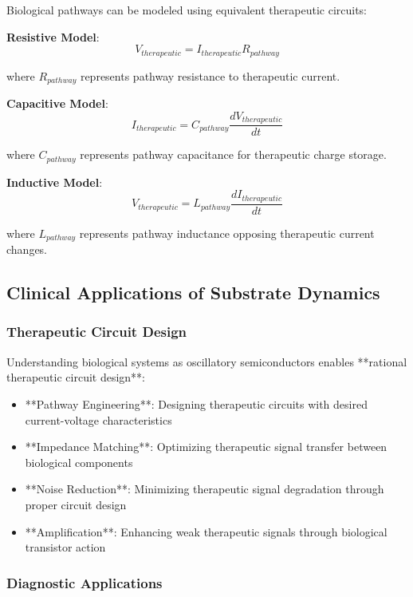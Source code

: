 \documentclass[12pt,a4paper]{article}
\begin{document}
Biological pathways can be modeled using equivalent therapeutic circuits:

\textbf{Resistive Model}:
\begin{equation}
V_{therapeutic} = I_{therapeutic} R_{pathway}
\end{equation}

where $R_{pathway}$ represents pathway resistance to therapeutic current.

\textbf{Capacitive Model}:
\begin{equation}
I_{therapeutic} = C_{pathway} \frac{dV_{therapeutic}}{dt}
\end{equation}

where $C_{pathway}$ represents pathway capacitance for therapeutic charge storage.

\textbf{Inductive Model}:
\begin{equation}
V_{therapeutic} = L_{pathway} \frac{dI_{therapeutic}}{dt}
\end{equation}

where $L_{pathway}$ represents pathway inductance opposing therapeutic current changes.

\subsection{Clinical Applications of Substrate Dynamics}

\subsubsection{Therapeutic Circuit Design}

Understanding biological systems as oscillatory semiconductors enables **rational therapeutic circuit design**:

\begin{itemize}
\item **Pathway Engineering**: Designing therapeutic circuits with desired current-voltage characteristics
\item **Impedance Matching**: Optimizing therapeutic signal transfer between biological components
\item **Noise Reduction**: Minimizing therapeutic signal degradation through proper circuit design
\item **Amplification**: Enhancing weak therapeutic signals through biological transistor action
\end{itemize}

\subsubsection{Diagnostic Applications}
\end{document}
